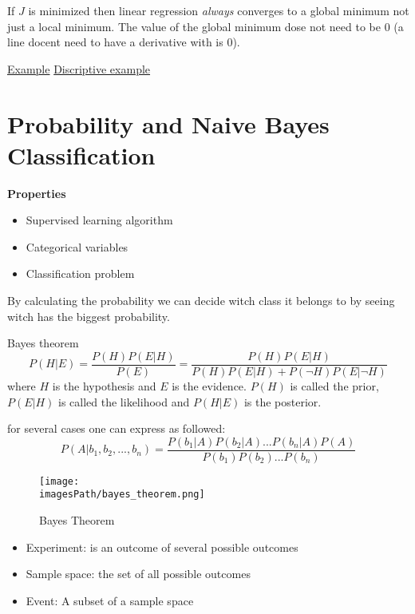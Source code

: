 If $J$ is minimized then linear regression \textit{always} converges to a global minimum not just a local minimum.
The value of the global minimum dose not need to be $0$ (a line docent need to have a derivative with is $0$).

\href{https://www.youtube.com/watch?v=ErpIw2ohNMs}{Example}
\href{https://machinelearningmastery.com/linear-regression-tutorial-using-gradient-descent-for-machine-learning/}{Discriptive example}


\section{Probability and Naive Bayes Classification}
\textbf{Properties}
\begin{itemize}
    \item Supervised learning algorithm
    \item Categorical variables 
    \item Classification problem
\end{itemize}

By calculating the probability we can decide witch class it belongs to by seeing witch 
has the biggest probability.

\begin{definitionblock}{Bayes theorem}
    \begin{equation*}
        P(H|E) = \frac{P(H)P(E|H)}{P(E)} = \frac{P(H)P(E|H)}{P(H)P(E|H) + P(\neg H)P(E|\neg H)}
    \end{equation*}
    where $H$ is the hypothesis and $E$ is the evidence. $P(H)$ is called the prior, $P(E|H)$ is called the likelihood
    and $P(H|E)$ is the posterior.

\end{definitionblock}

for several cases one can express as followed:
\begin{equation*}
    P(A|b_1,b_2,...,b_n) = \frac{P(b_1|A)P(b_2|A)...P(b_n|A)P(A)}{P(b_1)P(b_2)...P(b_n)}
\end{equation*}

\begin{figure}[!h]
    \centering
    \texttt{[image: \\imagesPath/bayes\_theorem.png]}
    \caption{Bayes Theorem}
\end{figure}

\begin{itemize}
    \item Experiment: is an outcome of several possible outcomes
    \item Sample space: the set of all possible outcomes
    \item Event: A subset of a sample space
\end{itemize}

